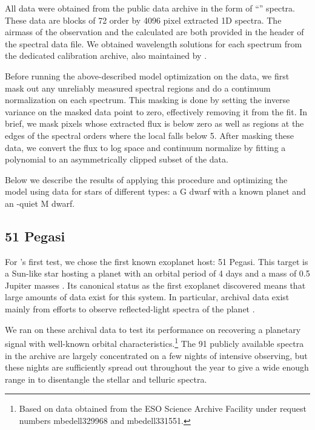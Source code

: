 \documentclass[modern]{aastex62}
\begin{document}
All data were obtained from the  public data archive in the form of ``'' spectra. 
These data are blocks of 72 order by 4096 pixel extracted 1D spectra. 
The airmass of the observation and the calculated \BERV are both provided in the  header of the spectral data file. 
We obtained wavelength solutions for each spectrum from the dedicated \HARPS calibration archive, also maintained by . 

Before running the above-described model optimization on the data, we first mask out any unreliably measured spectral regions and do a continuum normalization on each spectrum. 
This masking is done by setting the inverse variance on the masked data point to zero, effectively removing it from the fit. 
In brief, we mask pixels whose extracted flux is below zero as well as regions at the edges of the spectral orders where the local \SNR falls below 5. 
After masking these data, we convert the flux to log space and continuum normalize by fitting a polynomial to an asymmetrically clipped subset of the data. 

Below we describe the results of applying this procedure and optimizing the \wobble model using \HARPS data for stars of different types: a G dwarf with a known planet and an \RV-quiet M dwarf.

\subsection{51 Pegasi}

For \wobble's first test, we chose the first known exoplanet host: 51 Pegasi. 
This target is a Sun-like star hosting a planet with an orbital period of 4 days and a mass of 0.5 Jupiter masses \citep{Mayor1995}. 
Its canonical status as the first exoplanet discovered means that large amounts of data exist for this system. 
In particular, archival \HARPS data exist mainly from efforts to observe reflected-light spectra of the planet \citep{Martins2015}. 

We ran \wobble on these archival data to test its performance on recovering a planetary signal with well-known orbital characteristics.\footnote{Based on data obtained from the ESO Science Archive Facility under request numbers mbedell329968 and mbedell331551.} 
The 91 publicly available spectra in the \HARPS archive are largely concentrated on a few nights of intensive observing, but these nights are sufficiently spread out throughout the year to give a wide enough range in \BERV to disentangle the stellar and telluric spectra.
\end{document}
